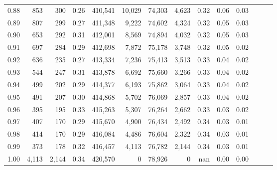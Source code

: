 \begin{tabular}{rrrrrrrrrrrrrr}
0.88 &     853 &    300 &  0.26 &  410,541 &   10,029 &  74,303 &   4,623 &  0.32 &  0.06 &      0.03 \\
0.89 &     807 &    299 &  0.27 &  411,348 &    9,222 &  74,602 &   4,324 &  0.32 &  0.05 &      0.03 \\
0.90 &     653 &    292 &  0.31 &  412,001 &    8,569 &  74,894 &   4,032 &  0.32 &  0.05 &      0.03 \\
0.91 &     697 &    284 &  0.29 &  412,698 &    7,872 &  75,178 &   3,748 &  0.32 &  0.05 &      0.02 \\
0.92 &     636 &    235 &  0.27 &  413,334 &    7,236 &  75,413 &   3,513 &  0.33 &  0.04 &      0.02 \\
0.93 &     544 &    247 &  0.31 &  413,878 &    6,692 &  75,660 &   3,266 &  0.33 &  0.04 &      0.02 \\
0.94 &     499 &    202 &  0.29 &  414,377 &    6,193 &  75,862 &   3,064 &  0.33 &  0.04 &      0.02 \\
0.95 &     491 &    207 &  0.30 &  414,868 &    5,702 &  76,069 &   2,857 &  0.33 &  0.04 &      0.02 \\
0.96 &     395 &    195 &  0.33 &  415,263 &    5,307 &  76,264 &   2,662 &  0.33 &  0.03 &      0.02 \\
0.97 &     407 &    170 &  0.29 &  415,670 &    4,900 &  76,434 &   2,492 &  0.34 &  0.03 &      0.01 \\
0.98 &     414 &    170 &  0.29 &  416,084 &    4,486 &  76,604 &   2,322 &  0.34 &  0.03 &      0.01 \\
0.99 &     373 &    178 &  0.32 &  416,457 &    4,113 &  76,782 &   2,144 &  0.34 &  0.03 &      0.01 \\
1.00 &   4,113 &  2,144 &  0.34 &  420,570 &        0 &  78,926 &       0 &   nan &  0.00 &      0.00 \\
\bottomrule
\end{tabular}
